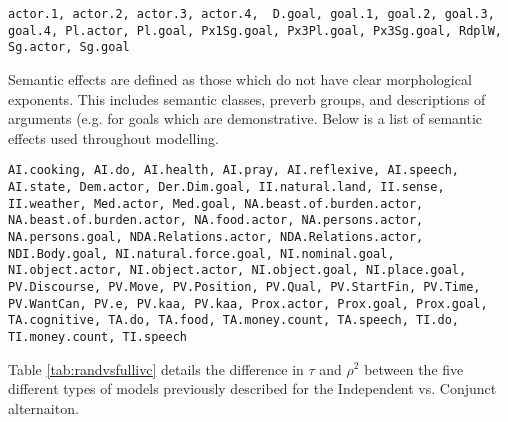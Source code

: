 \begin{lstlisting}[style=mystyle]
actor.1, actor.2, actor.3, actor.4,  D.goal, goal.1, goal.2, goal.3, goal.4, Pl.actor, Pl.goal, Px1Sg.goal, Px3Pl.goal, Px3Sg.goal, RdplW, Sg.actor, Sg.goal\end{lstlisting}

Semantic effects are defined as those which do not have clear morphological exponents. This includes semantic classes, preverb groups, and descriptions of arguments (e.g.  for goals which are demonstrative. Below is a list of semantic effects used throughout modelling.
  
\begin{lstlisting}[style=mystyle]
AI.cooking, AI.do, AI.health, AI.pray, AI.reflexive, AI.speech, AI.state, Dem.actor, Der.Dim.goal, II.natural.land, II.sense, II.weather, Med.actor, Med.goal, NA.beast.of.burden.actor, NA.beast.of.burden.actor, NA.food.actor, NA.persons.actor, NA.persons.goal, NDA.Relations.actor, NDA.Relations.actor, NDI.Body.goal, NI.natural.force.goal, NI.nominal.goal, NI.object.actor, NI.object.actor, NI.object.goal, NI.place.goal, PV.Discourse, PV.Move, PV.Position, PV.Qual, PV.StartFin, PV.Time, PV.WantCan, PV.e, PV.kaa, PV.kaa, Prox.actor, Prox.goal, Prox.goal, TA.cognitive, TA.do, TA.food, TA.money.count, TA.speech, TI.do, TI.money.count, TI.speech        \end{lstlisting} 
  
Table \ref{tab:randvsfullivc} details the difference in $\tau$ and $\rho^{2}$ between the five different types of models previously described for the Independent vs. Conjunct alternaiton.
  
